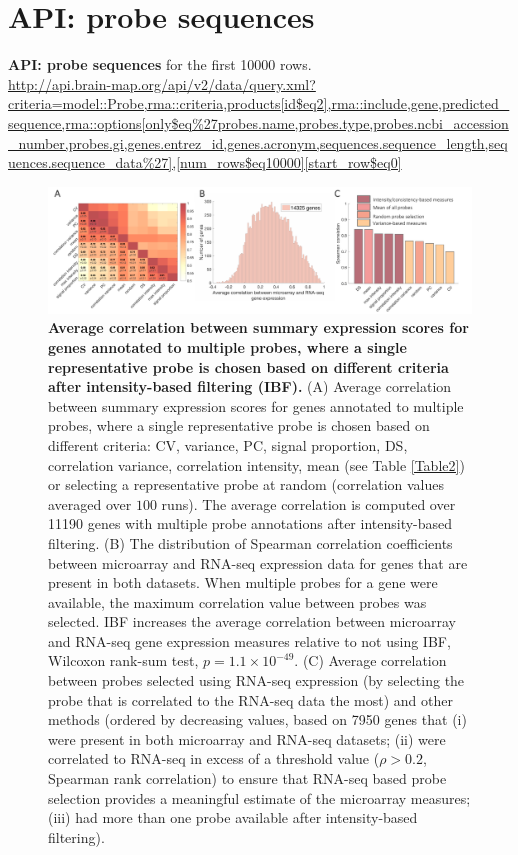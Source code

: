 \section{API: probe sequences}
\label{app:AppendixCh4_7}

\textbf{API: probe sequences} for the first \num{10000} rows.\\
\url{http://api.brain-map.org/api/v2/data/query.xml?criteria=model::Probe,rma::criteria,products[id$eq2],rma::include,gene,predicted_sequence,rma::options[only$eq%27probes.name,probes.type,probes.ncbi_accession_number,probes.gi,genes.entrez_id,genes.acronym,sequences.sequence_length,sequences.sequence_data%27],[num_rows$eq10000][start_row$eq0]}

\newpage

\begin{figure}[h!]
  \centering
    \includegraphics[width=1\textwidth]{Chapter4/FigureS1.pdf}
\caption{\textbf{Average correlation between summary expression scores for genes annotated to multiple probes, where a single representative probe is chosen based on different criteria after intensity-based filtering (IBF).}
(A) Average correlation between summary expression scores for genes annotated to multiple probes, where a single representative probe is chosen based on different criteria: CV, variance, PC, signal proportion, DS, correlation variance, correlation intensity, mean (see Table \ref{Table2}) or selecting a representative probe at random (correlation values averaged over $100$ runs). The average correlation is computed over \num{11190} genes with multiple probe annotations after intensity-based filtering. 
(B) The distribution of Spearman correlation coefficients between microarray and RNA-seq expression data for genes that are present in both datasets. When multiple probes for a gene were available, the maximum correlation value between probes was selected. IBF increases the average correlation between microarray and RNA-seq gene expression measures relative to not using IBF, Wilcoxon rank-sum test, $p=1.1 \times 10^{-49}$. 
(C) Average correlation between probes selected using RNA-seq expression (by selecting the probe that is correlated to the RNA-seq data the most) and other methods (ordered by decreasing values, based on \num{7950} genes that (i) were present in both microarray and RNA-seq datasets; (ii) were correlated to RNA-seq in excess of a threshold value ($\rho > 0.2$, Spearman rank correlation) to ensure that RNA-seq based probe selection provides a meaningful estimate of the microarray measures; (iii) had more than one probe available after intensity-based filtering). }
\label{fig:Ch4Sfig1}
\end{figure}


